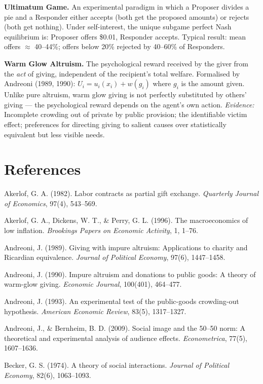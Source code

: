 \documentclass[12pt, letterpaper]{article}
\begin{document}
\textbf{Ultimatum Game.} An experimental paradigm in which a Proposer divides a pie and a Responder either accepts (both get the proposed amounts) or rejects (both get nothing). Under self-interest, the unique subgame perfect Nash equilibrium is: Proposer offers \$0.01, Responder accepts. Typical result: mean offers $\approx$ 40--44\%; offers below 20\% rejected by 40--60\% of Responders.

\textbf{Warm Glow Altruism.} The psychological reward received by the giver from the \textit{act} of giving, independent of the recipient's total welfare. Formalised by Andreoni (1989, 1990): $U_i = u_i(x_i) + w(g_i)$ where $g_i$ is the amount given. Unlike pure altruism, warm glow giving is not perfectly substituted by others' giving --- the psychological reward depends on the agent's own action. \textit{Evidence:} Incomplete crowding out of private by public provision; the identifiable victim effect; preferences for directing giving to salient causes over statistically equivalent but less visible needs.

\medskip


\section*{References}


Akerlof, G. A. (1982). Labor contracts as partial gift exchange. \textit{Quarterly Journal of Economics}, 97(4), 543--569.

Akerlof, G. A., Dickens, W. T., \& Perry, G. L. (1996). The macroeconomics of low inflation. \textit{Brookings Papers on Economic Activity}, 1, 1--76.

Andreoni, J. (1989). Giving with impure altruism: Applications to charity and Ricardian equivalence. \textit{Journal of Political Economy}, 97(6), 1447--1458.

Andreoni, J. (1990). Impure altruism and donations to public goods: A theory of warm-glow giving. \textit{Economic Journal}, 100(401), 464--477.

Andreoni, J. (1993). An experimental test of the public-goods crowding-out hypothesis. \textit{American Economic Review}, 83(5), 1317--1327.

Andreoni, J., \& Bernheim, B. D. (2009). Social image and the 50--50 norm: A theoretical and experimental analysis of audience effects. \textit{Econometrica}, 77(5), 1607--1636.

Becker, G. S. (1974). A theory of social interactions. \textit{Journal of Political Economy}, 82(6), 1063--1093.
\end{document}
